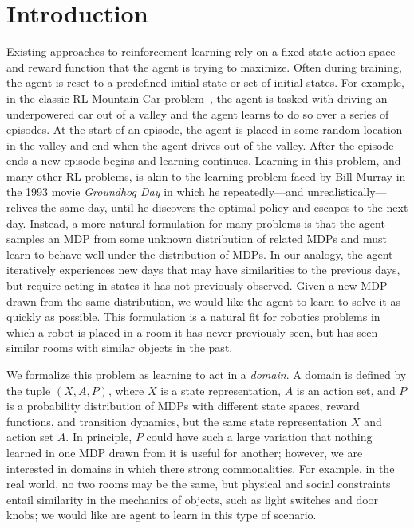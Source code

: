 \section{Introduction}
Existing approaches to reinforcement learning rely on a fixed state-action space and reward function that the agent is trying to maximize. Often during training, the agent is reset to a predefined initial state or set of initial states. For example, in the classic RL Mountain Car problem~\cite{singh1996reinforcement}, the agent is tasked with driving an underpowered car out of a valley and the agent learns to do so over a series of episodes. At the start of an episode, the agent is placed in some random location in the valley and end when the agent drives out of the valley. After the episode ends a new episode begins and learning continues. Learning in this problem, and many other RL problems, is akin to the learning problem faced by Bill Murray in the 1993 movie {\em Groundhog Day} in which he repeatedly---and unrealistically---relives the same day, until he discovers the optimal policy and escapes to the next day. Instead, a more natural formulation for many problems is that the agent samples an MDP from some unknown distribution of related MDPs and must learn to behave well under the distribution of MDPs. In our analogy, the agent iteratively experiences new days that may have similarities to the previous days, but require acting in states it has not previously observed. Given a new MDP drawn from the same distribution, we would like the agent to learn to solve it as quickly as possible. This formulation is a natural fit for robotics problems in which a robot is placed in a room it has never previously seen, but has seen similar rooms with similar objects in the past. 

We formalize this problem as learning to act in a {\em domain}. A domain is defined by the tuple $(X, A, P)$, where $X$ is a state representation, $A$ is an action set, and $P$ is a probability distribution of MDPs with different state spaces, reward functions, and transition dynamics, but the same state representation $X$ and action set $A$. In principle, $P$ could have such a large variation that nothing learned in one MDP drawn from it is useful for another; however, we are interested in domains in which there strong commonalities. For example, in the real world, no two rooms may be the same, but physical and social constraints entail similarity in the mechanics of objects, such as light switches and door knobs; we would like are agent to learn in this type of scenario. 

